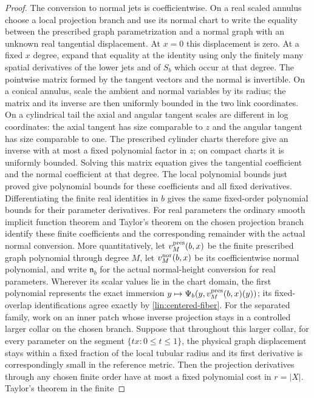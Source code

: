 \begin{proof}
The conversion to normal jets is coefficientwise.  On a real scaled
annulus choose a local projection branch and use its normal chart to write the equality between the
prescribed graph parametrization and a normal graph with an unknown
real tangential displacement.  At $x=0$ this displacement is zero.
At a fixed $x$ degree, expand that equality at the identity using only
the finitely many spatial derivatives of the lower jets and of $S_b$
which occur at that degree.  The pointwise matrix formed by the tangent
vectors and the normal is invertible.  On a conical annulus, scale the
ambient and normal variables by its radius; the matrix and its inverse
are then uniformly bounded in the two link coordinates.  On a cylindrical
tail the axial and angular tangent scales are different in log coordinates:
the axial tangent has size comparable to $z$ and the angular tangent has
size comparable to one.
The prescribed cylinder charts therefore give an inverse with at most a
fixed polynomial factor in $z$; on compact charts it is uniformly bounded.
Solving this matrix equation gives the
tangential coefficient and the normal coefficient at that degree.
The local polynomial bounds just proved give polynomial bounds for
these coefficients and all fixed derivatives.  Differentiating the finite
real identities in $b$ gives the same fixed-order polynomial bounds for
their parameter derivatives.  For real parameters the
ordinary smooth implicit function theorem and Taylor's theorem on the
chosen projection branch identify these finite coefficients and the corresponding remainder
with the actual normal conversion.  More quantitatively, let
$v_M^{\rm pres}(b,x)$ be the finite prescribed graph polynomial through
degree $M$, let $v_M^{\rm nor}(b,x)$ be its coefficientwise normal
polynomial, and write $\mathfrak n_b$ for the actual normal-height
conversion for real parameters.  Wherever its scalar values lie in the
chart domain, the first polynomial represents the exact immersion
$y\mapsto\Psi_b(y,v_M^{\rm pres}(b,x)(y))$; its fixed-overlap
identifications agree exactly by \eqref{lin:centered-fiber}.
For the separated family, work on an inner
patch whose inverse projection stays in a controlled larger collar on the
chosen branch.  Suppose that throughout this larger collar, for every parameter
on the segment $\{tx:0\le t\le1\}$, the physical graph displacement
stays within a fixed fraction of the local tubular radius and its first
derivative is correspondingly small in the reference metric.  Then the
projection derivatives through any chosen finite order have at most
a fixed polynomial cost in $r=|X|$.  Taylor's theorem in the finite

\end{proof}
